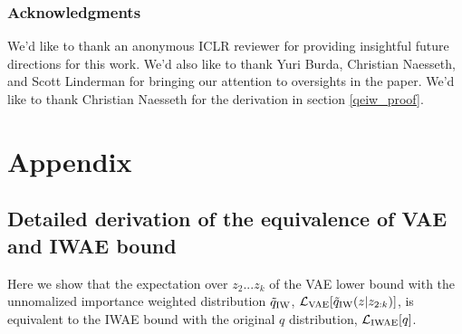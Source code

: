 \documentclass{article} %
\begin{document}
\subsubsection*{Acknowledgments}

We'd like to thank an anonymous ICLR reviewer for providing insightful future directions for this work. We'd also like to thank Yuri Burda, Christian Naesseth, and Scott Linderman for bringing our attention to oversights in the paper. We'd like to thank Christian Naesseth for the derivation in section \ref{qeiw_proof}.




\newpage

\section{Appendix}

\subsection{Detailed derivation of the equivalence of VAE and IWAE bound}
\label{detailed_derivation}

Here we show that the expectation over $z_2 ... z_k$ of the VAE lower bound with the unnomalized importance weighted distribution $\tilde{q}_{\textnormal{IW}}$, $\mathcal{L}_{\textnormal{VAE}}[\tilde{q}_{\textnormal{IW}}(z|z_{2:k})]$, is equivalent to the IWAE bound with the original $q$ distribution, $\mathcal{L}_{\textnormal{IWAE}}[q]$.
\end{document}
